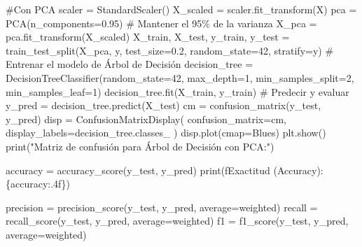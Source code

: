 \documentclass[
  letterpaper,
  DIV=11,
  numbers=noendperiod]{scrartcl}
\newenvironment{Shaded}{\begin{snugshade}}{\end{snugshade}}
\newcommand{\BuiltInTok}[1]{\textcolor[rgb]{0.00,0.23,0.31}{#1}}
\newcommand{\CommentTok}[1]{\textcolor[rgb]{0.37,0.37,0.37}{#1}}
\newcommand{\DecValTok}[1]{\textcolor[rgb]{0.68,0.00,0.00}{#1}}
\newcommand{\FloatTok}[1]{\textcolor[rgb]{0.68,0.00,0.00}{#1}}
\newcommand{\NormalTok}[1]{\textcolor[rgb]{0.00,0.23,0.31}{#1}}
\newcommand{\OperatorTok}[1]{\textcolor[rgb]{0.37,0.37,0.37}{#1}}
\newcommand{\SpecialCharTok}[1]{\textcolor[rgb]{0.37,0.37,0.37}{#1}}
\newcommand{\SpecialStringTok}[1]{\textcolor[rgb]{0.13,0.47,0.30}{#1}}
\newcommand{\StringTok}[1]{\textcolor[rgb]{0.13,0.47,0.30}{#1}}
\begin{document}
\begin{Shaded}
\begin{Highlighting}[]
\CommentTok{\#Con PCA }
\NormalTok{scaler }\OperatorTok{=}\NormalTok{ StandardScaler()}
\NormalTok{X\_scaled }\OperatorTok{=}\NormalTok{ scaler.fit\_transform(X)}
\NormalTok{pca }\OperatorTok{=}\NormalTok{ PCA(n\_components}\OperatorTok{=}\FloatTok{0.95}\NormalTok{)  }\CommentTok{\# Mantener el 95\% de la varianza}
\NormalTok{X\_pca }\OperatorTok{=}\NormalTok{ pca.fit\_transform(X\_scaled)}
\NormalTok{X\_train, X\_test, y\_train, y\_test }\OperatorTok{=}
\NormalTok{  train\_test\_split(X\_pca, y, test\_size}\OperatorTok{=}\FloatTok{0.2}\NormalTok{, random\_state}\OperatorTok{=}\DecValTok{42}\NormalTok{, stratify}\OperatorTok{=}\NormalTok{y)}
\CommentTok{\# Entrenar el modelo de Árbol de Decisión}
\NormalTok{decision\_tree }\OperatorTok{=}
\NormalTok{  DecisionTreeClassifier(random\_state}\OperatorTok{=}\DecValTok{42}\NormalTok{, max\_depth}\OperatorTok{=}\DecValTok{1}\NormalTok{, min\_samples\_split}\OperatorTok{=}\DecValTok{2}\NormalTok{, min\_samples\_leaf}\OperatorTok{=}\DecValTok{1}\NormalTok{)}
\NormalTok{decision\_tree.fit(X\_train, y\_train)}
\CommentTok{\# Predecir y evaluar}
\NormalTok{y\_pred }\OperatorTok{=}\NormalTok{ decision\_tree.predict(X\_test)}
\NormalTok{cm }\OperatorTok{=}\NormalTok{ confusion\_matrix(y\_test, y\_pred)}
\NormalTok{disp }\OperatorTok{=}\NormalTok{ ConfusionMatrixDisplay(}
\NormalTok{  confusion\_matrix}\OperatorTok{=}\NormalTok{cm,}
\NormalTok{  display\_labels}\OperatorTok{=}\NormalTok{decision\_tree.classes\_}
\NormalTok{)}
\NormalTok{disp.plot(cmap}\OperatorTok{=}\StringTok{\textquotesingle{}Blues\textquotesingle{}}\NormalTok{)}
\NormalTok{plt.show()}
\BuiltInTok{print}\NormalTok{(}\StringTok{"Matriz de confusión para Árbol de Decisión con PCA:"}\NormalTok{)}

\NormalTok{accuracy }\OperatorTok{=}\NormalTok{ accuracy\_score(y\_test, y\_pred)}
\BuiltInTok{print}\NormalTok{(}\SpecialStringTok{f\textquotesingle{}Exactitud (Accuracy): }\SpecialCharTok{\{}\NormalTok{accuracy}\SpecialCharTok{:.4f\}}\SpecialStringTok{\textquotesingle{}}\NormalTok{)}

\NormalTok{precision }\OperatorTok{=}\NormalTok{ precision\_score(y\_test, y\_pred, average}\OperatorTok{=}\StringTok{\textquotesingle{}weighted\textquotesingle{}}\NormalTok{)}
\NormalTok{recall }\OperatorTok{=}\NormalTok{ recall\_score(y\_test, y\_pred, average}\OperatorTok{=}\StringTok{\textquotesingle{}weighted\textquotesingle{}}\NormalTok{)}
\NormalTok{f1 }\OperatorTok{=}\NormalTok{ f1\_score(y\_test, y\_pred, average}\OperatorTok{=}\StringTok{\textquotesingle{}weighted\textquotesingle{}}\NormalTok{)}


\end{Highlighting}
\end{Shaded}
\end{document}

